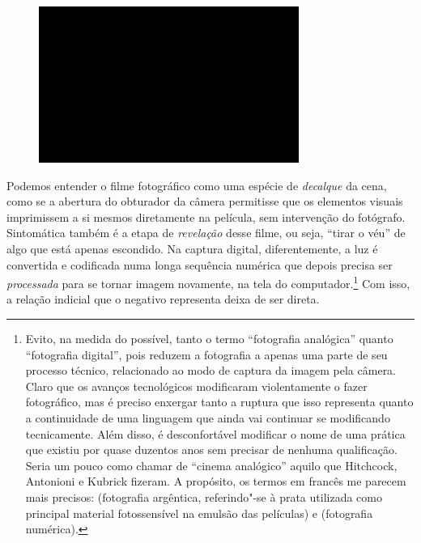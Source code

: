 \begin{figure}[!ht]

\centering
 \includegraphics[width=85mm]{./imgs/im1.jpg}
\caption{\tiny{}}

\end{figure}

Podemos entender o filme fotográfico como uma espécie de \emph{decalque}
da cena, como se a abertura do obturador da câmera permitisse que os
elementos visuais imprimissem a si mesmos diretamente na película, sem
intervenção do fotógrafo. Sintomática também é a etapa de \emph{revelação} desse
filme, ou seja, ``tirar o véu'' de algo que está apenas escondido. Na
captura digital, diferentemente, a luz é convertida e codificada numa
longa sequência numérica que depois precisa ser \emph{processada} para
se tornar imagem novamente, na tela do computador.\footnote{Evito, na
  medida do possível, tanto o termo ``fotografia analógica'' quanto
  ``fotografia digital'', pois reduzem a fotografia a apenas uma parte
  de seu processo técnico, relacionado ao modo de captura da imagem pela
  câmera. Claro que os avanços tecnológicos modificaram violentamente o
  fazer fotográfico, mas é preciso enxergar tanto a ruptura que isso
  representa quanto a continuidade de uma linguagem que ainda vai
  continuar se modificando tecnicamente. Além disso, é desconfortável
  modificar {} o nome de uma prática que existiu por
  quase duzentos anos sem precisar de nenhuma qualificação. Seria um
  pouco como chamar de ``cinema analógico'' aquilo que Hitchcock,
  Antonioni e Kubrick fizeram. A propósito, os termos em francês me
  parecem mais precisos: {} (fotografia
  argêntica, referindo"-se à prata utilizada como principal material
  fotossensível na emulsão das películas) e {} (fotografia numérica).} Com isso, a relação indicial que o
negativo representa deixa de ser direta.

